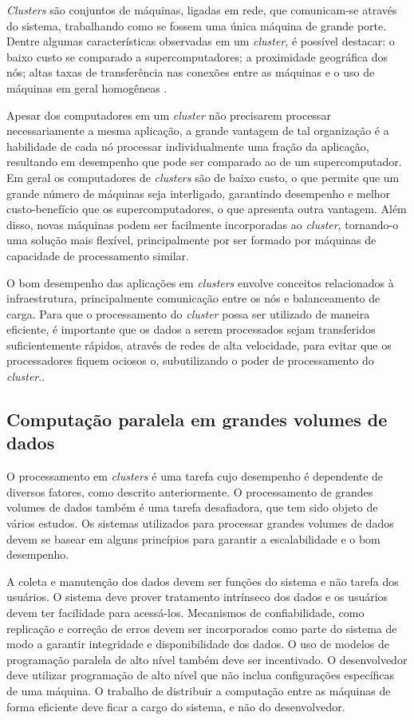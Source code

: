 \textit{Clusters} são conjuntos de máquinas, ligadas em rede, que comunicam-se através do sistema, trabalhando como se fossem uma única máquina de grande porte. 
Dentre algumas características observadas em um \textit{cluster}, é possível destacar: o baixo custo se comparado a supercomputadores; a proximidade geográfica dos nós; altas taxas de transferência nas conexões entre as máquinas e o uso de máquinas em geral homogêneas \cite{Toth:2008}.

Apesar dos computadores em um \textit{cluster} não precisarem processar necessariamente a mesma aplicação, a grande vantagem de tal organização é a habilidade de cada nó processar individualmente uma fração da aplicação, resultando em desempenho que pode ser comparado ao de um supercomputador.
Em geral os computadores de \textit{clusters} são de baixo custo, o que permite que um grande número de máquinas seja interligado, garantindo desempenho e melhor custo-benefício que os supercomputadores, o que apresenta outra vantagem. Além disso, novas máquinas podem ser facilmente incorporadas  ao \textit{cluster}, tornando-o uma solução mais flexível, principalmente por ser formado por máquinas de capacidade de processamento similar.

O bom desempenho das aplicações em \textit{clusters} envolve conceitos relacionados à infraestrutura, principalmente comunicação entre os nós e balanceamento de carga.
Para que o processamento do \textit{cluster} possa ser utilizado de maneira eficiente, é importante que os dados a serem processados sejam transferidos suficientemente rápidos, através de redes de alta velocidade, para evitar que os processadores fiquem ociosos o, subutilizando o poder de processamento do \textit{cluster}.\cite{Rauber:2010}. 


\subsection{Computação paralela em grandes volumes de dados}
O processamento em \textit{clusters} é uma tarefa cujo desempenho é dependente de diversos fatores, como descrito anteriormente. O processamento de grandes volumes de dados também é uma tarefa desafiadora, que tem sido objeto de vários estudos. Os sistemas utilizados para processar grandes volumes de dados devem se basear em alguns princípios para garantir a escalabilidade e o bom desempenho.

A coleta e manutenção dos dados devem ser funções do sistema e não tarefa dos usuários. O sistema deve prover tratamento intrínseco dos dados  e os usuários devem ter facilidade para acessá-los. Mecanismos de confiabilidade, como replicação e  correção de erros devem ser incorporados como parte do sistema de modo a garantir integridade e disponibilidade dos dados.
O uso de modelos de programação paralela de alto nível também deve ser incentivado. O desenvolvedor deve utilizar programação de alto nível que não inclua configurações específicas de uma máquina. O trabalho de distribuir a computação entre as máquinas de forma eficiente deve ficar a cargo do sistema, e não do desenvolvedor.

